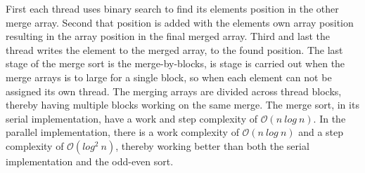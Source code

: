 First each thread uses binary search to find its elements position in the other merge array. Second that position is added with the elements own array position resulting in the array position in the final merged array. Third and last the thread writes the element to the merged array, to the found position. The last stage of the merge sort is the merge-by-blocks, is stage is carried out when the merge arrays is to large for a single block, so when each element can not be assigned its own thread. The merging arrays are divided across thread blocks, thereby having multiple blocks working on the same merge. The merge sort, in its serial implementation, have a work and step complexity of $\mathcal{O}(n~log~n)$. In the parallel implementation, there is a work complexity of $\mathcal{O}(n~log~n)$ and a step complexity of $\mathcal{O}(log^2~n)$, thereby working better than both the serial implementation and the odd-even sort.  